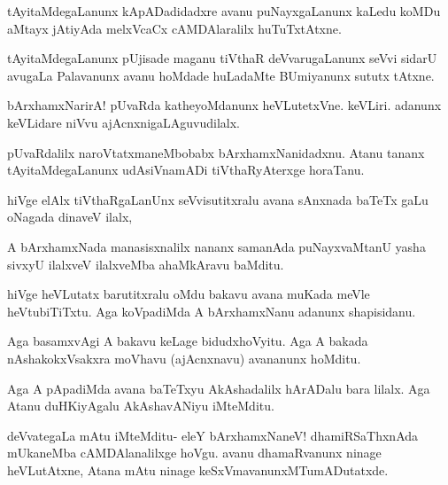 \documentclass{article}
\begin{document}
\begin{mng}%
tAyitaMdegaLanunx kApADadidadxre avanu puNayxgaLanunx kaLedu
koMDu aMtayx jAtiyAda melxVcaCx cAMDAlaralilx huTuTxtAtxne.
\end{mng}

\begin{mng}%
tAyitaMdegaLanunx pUjisade maganu tiVthaR deVvarugaLanunx seVvi
sidarU avugaLa Palavanunx avanu hoMdade huLadaMte BUmiyanunx sututx
tAtxne.
\end{mng}

\begin{mng}%
bArxhamxNarirA! pUvaRda katheyoMdanunx heVLutetxVne. keVLiri.
adanunx keVLidare niVvu ajAcnxnigaLAguvudilalx.
\end{mng}

\begin{mng}%
pUvaRdalilx naroVtatxmaneMbobabx bArxhamxNanidadxnu. Atanu
tananx tAyitaMdegaLanunx udAsiVnamADi tiVthaRyAterxge horaTanu.
\end{mng}

\begin{mng}%
hiVge elAlx tiVthaRgaLanUnx seVvisutitxralu avana sAnxnada baTeTx
gaLu oNagada dinaveV ilalx,
\end{mng}

\begin{mng}%
A bArxhamxNada manasisxnalilx nananx samanAda puNayxvaMtanU yasha
sivxyU ilalxveV ilalxveMba ahaMkAravu baMditu.
\end{mng}

\begin{mng}%
hiVge heVLutatx barutitxralu oMdu bakavu avana muKada meVle
heVtubiTiTxtu. Aga koVpadiMda A bArxhamxNanu adanunx shapisidanu.
\end{mng}

\begin{mng}%
Aga basamxvAgi A bakavu keLage bidudxhoVyitu. Aga A bakada
nAshakokxVsakxra moVhavu (ajAcnxnavu) avananunx hoMditu.
\end{mng}

\begin{mng}%
Aga A pApadiMda avana baTeTxyu AkAshadalilx hArADalu bara
lilalx. Aga Atanu duHKiyAgalu AkAshavANiyu iMteMditu.
\end{mng}

\begin{mng}%
deVvategaLa mAtu iMteMditu- eleY bArxhamxNaneV! dhamiRSaThxnAda 
mUkaneMba cAMDAlanalilxge hoVgu. avanu dhamaRvanunx ninage 
heVLutAtxne, Atana mAtu ninage keSxVmavanunxMTumADutatxde.
\end{mng}
\end{document}
